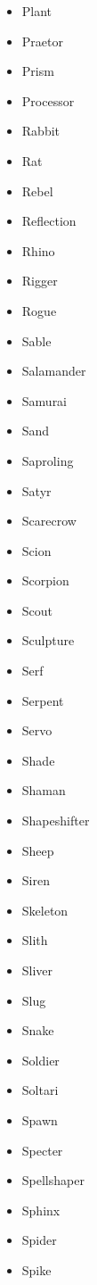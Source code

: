 \documentclass{article}
\begin{document}
\begin{multicols}{3}
\begin{itemize}
        \item Plant
        \item Praetor
        \item Prism
        \item Processor
        \item Rabbit
        \item Rat
        \item Rebel
        \item Reflection
        \item Rhino
        \item Rigger
        \item Rogue
        \item Sable
        \item Salamander
        \item Samurai
        \item Sand
        \item Saproling
        \item Satyr
        \item Scarecrow
        \item Scion
        \item Scorpion
        \item Scout
        \item Sculpture
        \item Serf
        \item Serpent
        \item Servo
        \item Shade
        \item Shaman
        \item Shapeshifter
        \item Sheep
        \item Siren
        \item Skeleton
        \item Slith
        \item Sliver
        \item Slug
        \item Snake
        \item Soldier
        \item Soltari
        \item Spawn
        \item Specter
        \item Spellshaper
        \item Sphinx
        \item Spider
        \item Spike

\end{itemize}
\end{multicols}
\end{document}

